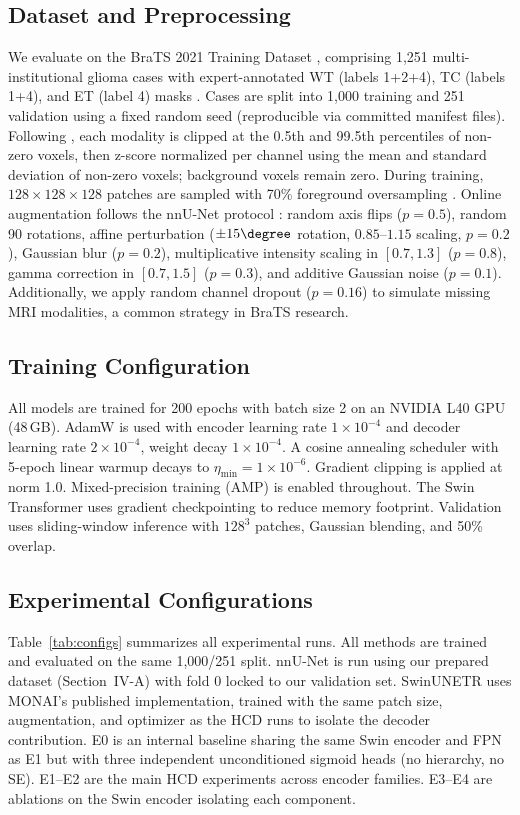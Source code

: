 \documentclass[conference]{IEEEtran}
\begin{document}
\subsection{Dataset and Preprocessing}
We evaluate on the BraTS 2021 Training Dataset \cite{brats2021},
comprising 1,251 multi-institutional glioma cases with expert-annotated
WT (labels 1+2+4), TC (labels 1+4), and ET (label 4) masks
\cite{menze_brats}. Cases are split into 1,000 training and 251
validation using a fixed random seed (reproducible via committed
manifest files). Following \cite{isensee_3dunet}, each modality is
clipped at the 0.5th and 99.5th percentiles of non-zero voxels, then
z-score normalized per channel using the mean and standard deviation of
non-zero voxels; background voxels remain zero. During training,
$128{\times}128{\times}128$ patches are sampled with 70\% foreground
oversampling \cite{isensee_3dunet}. Online augmentation follows the
nnU-Net protocol \cite{isensee_3dunet}: random axis flips ($p{=}0.5$),
random 90\textdegree{} rotations, affine perturbation ($\pm15\degree$
rotation, $0.85{\text{--}}1.15$ scaling, $p{=}0.2$), Gaussian blur
($p{=}0.2$), multiplicative intensity scaling in $[0.7, 1.3]$
($p{=}0.8$), gamma correction in $[0.7, 1.5]$ ($p{=}0.3$), and
additive Gaussian noise ($p{=}0.1$). Additionally, we apply random
channel dropout ($p{=}0.16$) to simulate missing MRI modalities, a
common strategy in BraTS research.

\subsection{Training Configuration}
All models are trained for 200 epochs with batch size 2 on an NVIDIA
L40 GPU (48\,GB). AdamW \cite{loshchilov_adamw} is used with encoder
learning rate $1{\times}10^{-4}$ and decoder learning rate
$2{\times}10^{-4}$, weight decay $1{\times}10^{-4}$. A cosine
annealing scheduler with 5-epoch linear warmup decays to
$\eta_{\min}{=}1{\times}10^{-6}$. Gradient clipping is applied at norm
1.0. Mixed-precision training (AMP) is enabled throughout. The Swin
Transformer uses gradient checkpointing to reduce memory footprint.
Validation uses sliding-window inference with $128^3$ patches,
Gaussian blending, and 50\% overlap.

\subsection{Experimental Configurations}
Table~\ref{tab:configs} summarizes all experimental runs.
All methods are trained and evaluated on the same 1,000/251 split.
nnU-Net \cite{isensee_3dunet} is run using our prepared dataset
(Section~IV-A) with fold 0 locked to our validation set.
SwinUNETR \cite{swinunetr} uses MONAI's published implementation,
trained with the same patch size, augmentation, and optimizer as the
HCD runs to isolate the decoder contribution.
E0 is an internal baseline sharing the same Swin encoder and FPN
as E1 but with three independent unconditioned sigmoid heads (no
hierarchy, no SE). E1--E2 are the main HCD experiments across encoder
families. E3--E4 are ablations on the Swin encoder isolating each
component.
\end{document}
